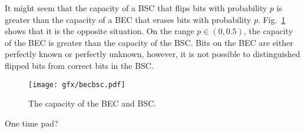 
It might seem that the capacity of a {BSC} that flips bits with probability $p$ is greater than the capacity of a {BEC} that erases bits with probability $p$. Fig.~\ref{fig:becbsc} shows that it is the opposite situation. On the range $p\in\left( 0,0.5\right)$, the capacity of the {BEC} is greater than the capacity of the {BSC}. Bits on the {BEC} are either perfectly known or perfectly unknown, however, it is not possible to distinguished flipped bits from correct bits in the {BSC}.

\begin{figure}[h]
\begin{center}
\texttt{[image: gfx/becbsc.pdf]}
\caption{The capacity of the BEC and BSC.}
\label{fig:becbsc}
\end{center}
\end{figure}


One time pad?
